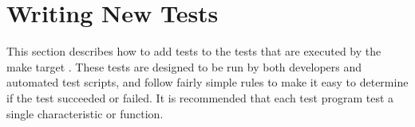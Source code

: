 \ifx\insingle\undefined
\else
\let\subsubsection=\subsection
\let\subsection=\section
\fi

\subsection{Writing New Tests}
\label{sec:new-tests}
This section describes how to add tests to the tests that are executed
by the make target .  These tests are designed to be run
by both developers and automated test scripts, and follow fairly
simple rules to make it easy to determine if the test succeeded or
failed.  It is recommended that each test program test a single
characteristic or function.

